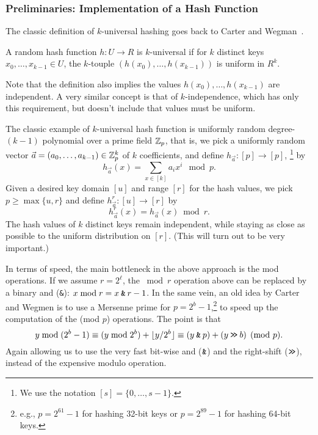 \subsubsection{Preliminaries: Implementation of a Hash Function}
The classic definition of $k$-universal hashing
goes back to Carter and Wegman~\cite{wegman81kwise}.
\begin{definition}
   A random hash function $h:U\to R$ is $k$-universal if for $k$
   distinct keys $x_0,\ldots,x_{k-1}\in U$, the $k$-touple
   $(h(x_0),\ldots,h(x_{k-1}))$ is uniform in $R^k$.
\end{definition}
\noindent
Note that the definition also implies the values 
$h(x_0),\ldots,h(x_{k-1})$ are independent.
A very similar concept is that of $k$-independence, which has only this requirement, but doesn't include that values must be uniform.

The classic example of $k$-universal
hash function is uniformly random degree-$(k-1)$ polynomial over a prime field
$\mathbb Z_p$, that is, we pick a uniformly random vector
$\vec a=(a_0,\ldots,a_{k-1})\in \mathbb Z_p^k$ of $k$ coefficients, and define
$h_{\vec a}:[p]\to[p]$,
\footnote{ We use the notation $[s]=\{0,\ldots,s-1\}$.  }
   by 
\[h_{\vec a}(x)=\sum_{x\in[k]}a_i x^i \mod p.\]
%
Given a desired key domain $[u]$ and range $[r]$ for the hash values, we pick
$p\geq \max\{u,r\}$ and define
$h^r_{\vec a}:[u]\to[r]$ by
\[h^r_{\vec a}(x)=h_{\vec a}(x)\bmod r.\]
The  hash values of $k$ distinct keys remain independent,
while staying as close as possible to the uniform distribution on $[r]$.
(This will turn out to be very important.)

In terms of speed, the main bottleneck in the above approach is the mod operations.
If we assume $r=2^\ell$, the $\bmod r$ operation above can be replaced by a binary {\sc and} (\texttt{\&}): $x \bmod r = x \mathbin{\texttt{\&}} r-1$.
In the same vein, an old idea by 
Carter and Wegmen \cite{carter77universal} is to use a
Mersenne prime for $p=2^b-1$,\footnote{e.g., $p=2^{61}-1$ for hashing 32-bit keys or
$p=2^{89}-1$ for hashing 64-bit keys.}
to speed up the computation of the (mod $p$) operations.
The point is that
\begin{equation}
   y \bmod (2^b-1)
   \equiv (y\bmod 2^{b}) + \lfloor {y/2^b} \rfloor
   \equiv (y \mathbin{\texttt{\&}} p) + (y \mathbin{\texttt{>\!>}} b)
   \pmod {p}.
   \label{eq:Mersenne}
\end{equation}
Again allowing us to use the very fast bit-wise {\sc and} ($\mathbin{\texttt{\&}}$) and the right-shift ($\mathbin{\texttt{>\!>}}$),
instead of the expensive modulo operation.


